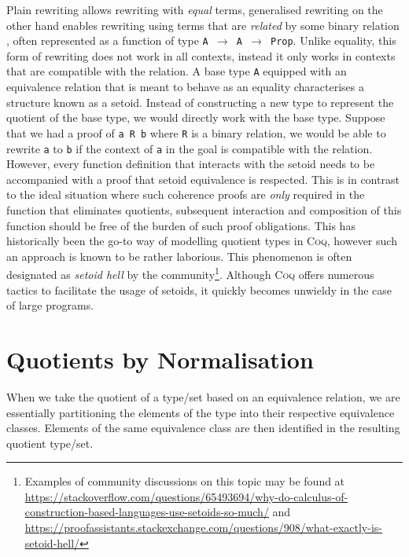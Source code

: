 \documentclass[12pt,twoside,maitrise]{dms}
\theoremstyle{definition}
\numberwithin{equation}{section}
\numberwithin{table}{chapter}
\numberwithin{figure}{chapter}
\newcommand\kw[1] {\textsf{#1}}
\newcommand\id[1] {\texttt{#1}}
\newcommand\fn[1] {\texttt{#1}}
\def\Coq{\textsc{Coq}\xspace}
\begin{document}
Plain rewriting allows rewriting with \emph{equal} terms, generalised
rewriting\cite{sozeau2009new, coq-gen-rewriting} on the other hand enables
rewriting using terms that are \emph{related} by some binary relation , often
represented as a function of type \fn{A $\rightarrow$ A $\rightarrow$
  \kw{Prop}}. Unlike equality, this form of rewriting does not work in all
contexts, instead it only works in contexts that are compatible with the
relation. A base type \id{A} equipped with an equivalence relation that is meant
to behave as an equality characterises a structure known as a
setoid\cite{hofmann1995simple}. Instead of constructing a new type to represent
the quotient of the base type, we would directly work with the base type.
Suppose that we had a proof of \fn{a R b} where \id{R} is a binary relation, we
would be able to rewrite \id{a} to \id{b} if the context of \id{a} in the goal
is compatible with the relation. However, every function definition that
interacts with the setoid needs to be accompanied with a proof that setoid
equivalence is respected. This is in contrast to the ideal situation where such
coherence proofs are \emph{only} required in the function that eliminates
quotients, subsequent interaction and composition of this function should be
free of the burden of such proof obligations. This has historically been the
go-to way of modelling quotient types in \Coq{}, however such an approach is
known to be rather laborious. This phenomenon is often designated as
\emph{setoid hell} by the community\footnote{Examples of community discussions
on this topic may be found at
\url{https://stackoverflow.com/questions/65493694/why-do-calculus-of-construction-based-languages-use-setoids-so-much/}
and
\url{https://proofassistants.stackexchange.com/questions/908/what-exactly-is-setoid-hell/}}.
Although \Coq{} offers numerous tactics to facilitate the usage of setoids, it
quickly becomes unwieldy in the case of large programs.

\section{Quotients by Normalisation}
When we take the quotient of a type/set based on an equivalence relation, we are
essentially partitioning the elements of the type into their respective
equivalence classes. Elements of the same equivalence class are then identified
in the resulting quotient type/set.
\end{document}
